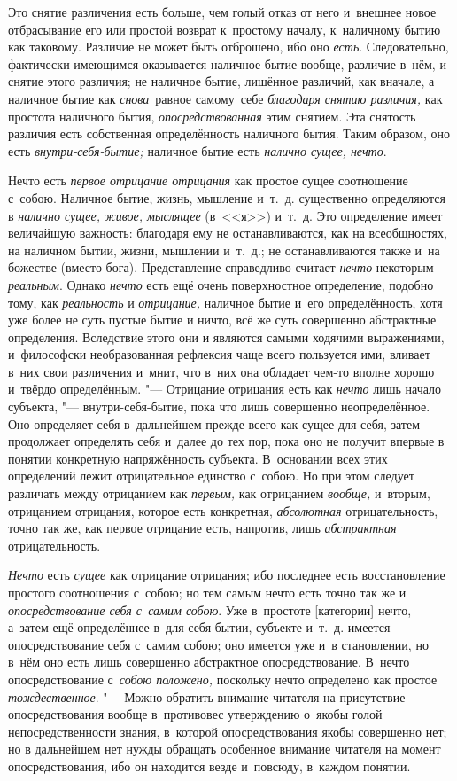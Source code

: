 Это снятие различения есть больше, чем голый отказ от него и~внешнее новое
отбрасывание его или простой возврат к~простому началу, к~наличному бытию как
таковому. Различие не может быть отброшено, ибо оно {\em есть}. Следовательно,
фактически имеющимся оказывается наличное бытие вообще, различие в~нём,
и снятие этого различия; не наличное бытие, лишённое различий, как вначале,
а наличное бытие как {\em снова}~равное самому~себе
{\em благодаря снятию различия,} как простота наличного бытия,
{\em опосредствованная} этим снятием. Эта снятость различия есть
собственная определённость наличного бытия. Таким образом, оно есть
{\em внутри-себя-бытие;} наличное бытие есть {\em налично сущее, нечто}.

Нечто есть {\em первое отрицание отрицания} как простое
сущее соотношение с~собою. Наличное бытие, жизнь, мышление и~т.~д.
существенно определяются в {\em налично сущее,}
{\em живое, мыслящее} (в~<<я>>)
и~т.~д. Это определение имеет величайшую важность: благодаря ему не
останавливаются, как на всеобщностях, на наличном бытии, жизни, мышлении
и~т.~д.; не останавливаются также и~на божестве (вместо бога).
Представление справедливо считает {\em нечто} некоторым
{\em реальным}. Однако {\em нечто}
есть ещё очень поверхностное определение, подобно тому, как
{\em реальность} и {\em отрицание,}
наличное бытие и~его определённость, хотя уже более не суть пустые бытие и
ничто, всё же суть совершенно абстрактные определения. Вследствие этого они
и являются самыми ходячими выражениями, и~философски необразованная
рефлексия чаще всего пользуется ими, вливает в~них свои различения и~мнит,
что в~них она обладает чем-то вполне хорошо и~твёрдо определённым. "---
Отрицание отрицания есть как {\em нечто} лишь начало
субъекта, "--- внутри-себя-бытие, пока что лишь совершенно неопределённое. Оно
определяет себя в~дальнейшем прежде всего как сущее для себя, затем
продолжает определять себя и~далее до тех пор, пока оно не получит впервые
в понятии конкретную напряжённость субъекта. В~основании всех этих
определений лежит отрицательное единство с~собою. Но при этом следует
различать между отрицанием как {\em первым,} как
отрицанием {\em вообще,} и~вторым, отрицанием
отрицания, которое есть конкретная, {\em абсолютная}
отрицательность, точно так же, как первое отрицание есть, напротив, лишь
{\em абстрактная} отрицательность.

{\em Нечто} есть {\em сущее} как отрицание отрицания; ибо последнее есть
восстановление простого соотношения с~собою; но тем самым нечто есть точно так
же и {\em опосредствование себя с~самим собою}. Уже в~простоте [категории]
нечто, а~затем ещё определённее в~для-себя-бытии, субъекте и~т.~д. имеется
опосредствование себя с~самим собою; оно имеется уже и~в становлении, но в~нём
оно есть лишь совершенно абстрактное опосредствование. В~нечто опосредствование
с~{\em собою положено,} поскольку нечто определено как простое
{\em тождественное}. "--- Можно обратить внимание читателя на присутствие
опосредствования вообще в~противовес утверждению о~якобы голой
непосредственности знания, в~которой опосредствования якобы совершенно нет; но
в дальнейшем нет нужды обращать особенное внимание читателя на момент
опосредствования, ибо он находится везде и~повсюду, в~каждом понятии.

